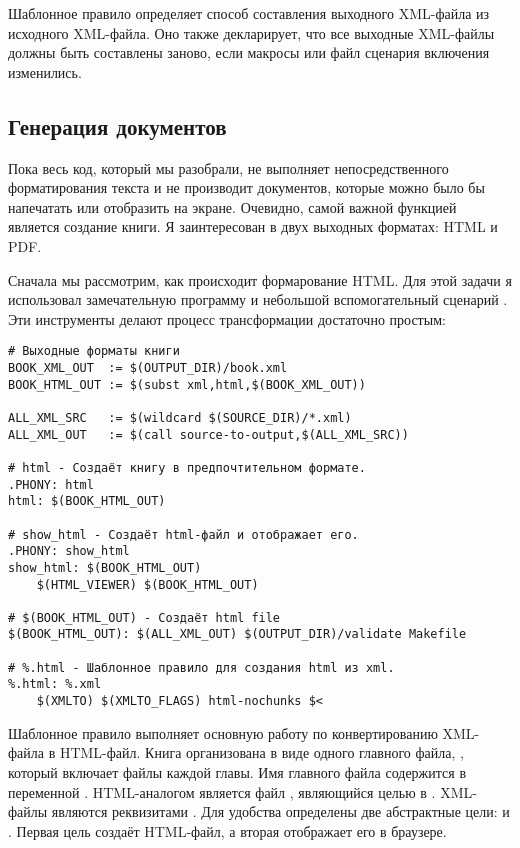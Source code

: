 Шаблонное правило определяет способ составления выходного XML-файла из
исходного XML-файла. Оно также декларирует, что все выходные XML-файлы
должны быть составлены заново, если макросы или файл сценария
включения изменились.

\subsection{Генерация документов}

Пока весь код, который мы разобрали, не выполняет непосредственного
форматирования текста и не производит документов, которые можно было
бы напечатать или отобразить на экране. Очевидно, самой важной
функцией  является создание книги. Я заинтересован в двух
выходных форматах: HTML и PDF.

Сначала мы рассмотрим, как происходит формарование HTML. Для этой
задачи я использовал замечательную программу  и
небольшой вспомогательный сценарий . Эти инструменты
делают процесс трансформации достаточно простым:

\begin{verbatim}
# Выходные форматы книги
BOOK_XML_OUT  := $(OUTPUT_DIR)/book.xml
BOOK_HTML_OUT := $(subst xml,html,$(BOOK_XML_OUT))

ALL_XML_SRC   := $(wildcard $(SOURCE_DIR)/*.xml)
ALL_XML_OUT   := $(call source-to-output,$(ALL_XML_SRC))

# html - Создаёт книгу в предпочтительном формате.
.PHONY: html
html: $(BOOK_HTML_OUT)

# show_html - Создаёт html-файл и отображает его.
.PHONY: show_html
show_html: $(BOOK_HTML_OUT)
    $(HTML_VIEWER) $(BOOK_HTML_OUT)

# $(BOOK_HTML_OUT) - Создаёт html file
$(BOOK_HTML_OUT): $(ALL_XML_OUT) $(OUTPUT_DIR)/validate Makefile

# %.html - Шаблонное правило для создания html из xml.
%.html: %.xml
    $(XMLTO) $(XMLTO_FLAGS) html-nochunks $<
\end{verbatim}

Шаблонное правило выполняет основную работу по конвертированию
XML-файла в HTML-файл. Книга организована в виде одного главного
файла, , который включает файлы каждой главы. Имя
главного файла содержится в переменной
. HTML-аналогом является файл
, являющийся целью в . XML-файлы
являются реквизитами . Для удобства
определены две абстрактные цели:  и .
Первая цель создаёт HTML-файл, а вторая отображает его в браузере.

